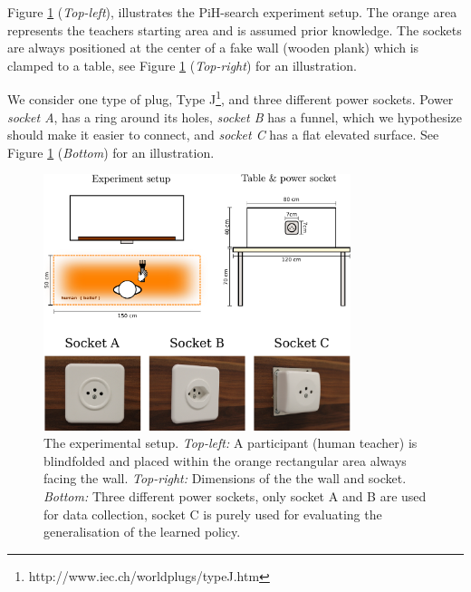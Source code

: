 
Figure \ref{fig:search_task_setup} (\textit{Top-left}), illustrates the PiH-search experiment setup. The orange area represents 
the teachers starting area and is assumed prior knowledge. The sockets are always positioned at the center of a fake wall (wooden plank) which is clamped to a table, see 
Figure \ref{fig:search_task_setup} (\textit{Top-right}) for an illustration. 

We consider one type of plug, Type J\footnote{http://www.iec.ch/worldplugs/typeJ.htm}, and three different power sockets. 
Power \textit{socket A}, has a ring around its holes, \textit{socket B} has a funnel, which we hypothesize should make 
it easier to connect, and \textit{socket C} has a flat elevated surface. See Figure \ref{fig:search_task_setup}
(\textit{Bottom}) for an illustration. 

\begin{figure}
 \centering
 \includegraphics[width=0.8\textwidth]{./ch4-PiH/Figures/Fig/experiment_setup_and_design.pdf}
 \caption{The experimental setup. \textit{Top-left:} A participant (human teacher) is blindfolded and 
    placed within the orange rectangular area always facing the wall. \textit{Top-right:} Dimensions of the 
    the wall and socket. \textit{Bottom:} Three different power sockets, only socket A and B are used for data collection, socket
    C is purely used for evaluating the generalisation of the learned policy.}
    \label{fig:search_task_setup}
\end{figure}

